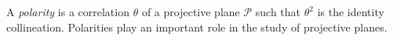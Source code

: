 A \textit{polarity} is a correlation $\theta$ of a projective plane $\mathcal{P}$ such that $\theta^2$ is the identity collineation. Polarities play an important role in the study of projective planes.

